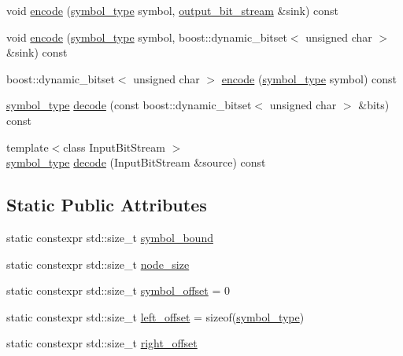 \begin{DoxyCompactItemize}
\item 
void \mbox{\hyperlink{classirk_1_1alphabetical__bst_a788eae986e42bf08ba2566927416a367}{encode}} (\mbox{\hyperlink{classirk_1_1alphabetical__bst_a296ccb8fa9fa9dce3b3c3beab0a5ca28}{symbol\+\_\+type}} symbol, \mbox{\hyperlink{classirk_1_1output__bit__stream}{output\+\_\+bit\+\_\+stream}} \&sink) const
\item 
void \mbox{\hyperlink{classirk_1_1alphabetical__bst_a921485c053b07711352642fdb638b45e}{encode}} (\mbox{\hyperlink{classirk_1_1alphabetical__bst_a296ccb8fa9fa9dce3b3c3beab0a5ca28}{symbol\+\_\+type}} symbol, boost\+::dynamic\+\_\+bitset$<$ unsigned char $>$ \&sink) const
\item 
boost\+::dynamic\+\_\+bitset$<$ unsigned char $>$ \mbox{\hyperlink{classirk_1_1alphabetical__bst_a4d63267c3e8de620411494f5b49fa2a2}{encode}} (\mbox{\hyperlink{classirk_1_1alphabetical__bst_a296ccb8fa9fa9dce3b3c3beab0a5ca28}{symbol\+\_\+type}} symbol) const
\item 
\mbox{\hyperlink{classirk_1_1alphabetical__bst_a296ccb8fa9fa9dce3b3c3beab0a5ca28}{symbol\+\_\+type}} \mbox{\hyperlink{classirk_1_1alphabetical__bst_ab692b132ff3a1e9f27f95af247437e1d}{decode}} (const boost\+::dynamic\+\_\+bitset$<$ unsigned char $>$ \&bits) const
\item 
{\footnotesize template$<$class Input\+Bit\+Stream $>$ }\\\mbox{\hyperlink{classirk_1_1alphabetical__bst_a296ccb8fa9fa9dce3b3c3beab0a5ca28}{symbol\+\_\+type}} \mbox{\hyperlink{classirk_1_1alphabetical__bst_ad16d9e58c78eafe81f08c20171973cd7}{decode}} (Input\+Bit\+Stream \&source) const
\end{DoxyCompactItemize}
\subsection*{Static Public Attributes}
\begin{DoxyCompactItemize}
\item 
static constexpr std\+::size\+\_\+t \mbox{\hyperlink{classirk_1_1alphabetical__bst_aab79d45f120c441ecfe435a15f060553}{symbol\+\_\+bound}}
\item 
static constexpr std\+::size\+\_\+t \mbox{\hyperlink{classirk_1_1alphabetical__bst_a6f7d3f7002730eb7840e449d4d371235}{node\+\_\+size}}
\item 
static constexpr std\+::size\+\_\+t \mbox{\hyperlink{classirk_1_1alphabetical__bst_aeed9426027198ce7abe963119de8191d}{symbol\+\_\+offset}} = 0
\item 
static constexpr std\+::size\+\_\+t \mbox{\hyperlink{classirk_1_1alphabetical__bst_a0cc871d4fcdf8a37436594bc32eec076}{left\+\_\+offset}} = sizeof(\mbox{\hyperlink{classirk_1_1alphabetical__bst_a296ccb8fa9fa9dce3b3c3beab0a5ca28}{symbol\+\_\+type}})
\item 
static constexpr std\+::size\+\_\+t \mbox{\hyperlink{classirk_1_1alphabetical__bst_ac354051aeafc78d341cc467d65c8c45a}{right\+\_\+offset}}
\end{DoxyCompactItemize}


